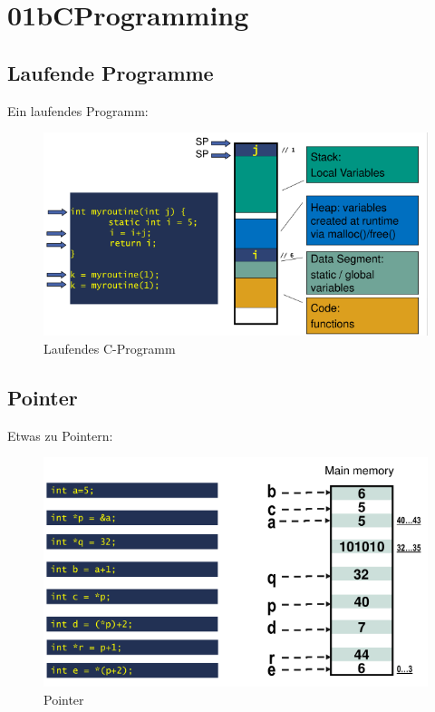 \documentclass[a4paper]{scrreprt}
\begin{document}
\chapter{01bCProgramming}

\section{Laufende Programme}

Ein laufendes Programm:

\begin{figure}[ht]
\centering
\includegraphics[scale=0.6]{graphics/running_program.png}
\caption{Laufendes C-Programm}
\end{figure}

\section{Pointer}

Etwas zu Pointern:

\begin{figure}[ht]
\centering
\includegraphics[scale=0.6]{graphics/pointer.png}
\caption{Pointer}
\end{figure}
\end{document}
